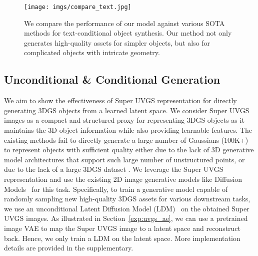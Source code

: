 

\begin{figure}[t]
\centering
\texttt{[image: imgs/compare\_text.jpg]} 
\vspace{-0.4cm}
\caption{
We compare the performance of our model against various SOTA methods for text-conditional object synthesis. Our method not only generates high-quality assets for simpler objects, but also for complicated objects with intricate geometry. 
}
\label{fig:compare_text}
\vspace{-0.6cm}
\end{figure}

\vspace{-0.1cm}
\subsection{Unconditional \& Conditional Generation}
We aim to show the effectiveness of Super UVGS representation for directly generating 3DGS objects from a learned latent space. 
We consider Super UVGS images as a compact and structured proxy for representing 3DGS objects as it maintains the 3D object information while also providing learnable features. 
The existing methods fail to directly generate a large number of Gaussians (\eg 100K+) to represent objects with sufficient quality either due to the lack of 3D generative model architectures that support such large number of unstructured points, or due to the lack of a large 3DGS dataset \cite{splatterimage2024, lgm2025, triplanemeetsgs2024, gaussiancube2024, gsd2024}. 
We leverage the Super UVGS representation and use the existing 2D image generative models like Diffusion Models~\cite{ddim} for this task. 
Specifically, to train a generative model capable of randomly sampling new high-quality 3DGS assets for various downstream tasks, we use an unconditional Latent Diffusion Model (LDM)~\cite{stable_diffusion} on the obtained Super UVGS images. 
As illustrated in Section~\ref{exp:uvgs_ae}, we can use a pretrained image VAE to map the Super UVGS image to a latent space and reconstruct back. Hence, we only train a LDM on the latent space. More implementation details are provided in the supplementary.

